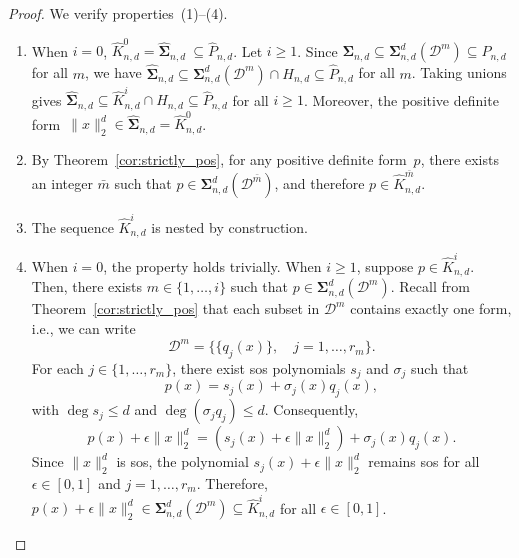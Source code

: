 \documentclass[12pt]{article}
\newcommand{\NN}{P}
\newcommand{\SOS}{\mathbf{\Sigma}}
\newcommand{\HNN}{\widehat{P}}
\newcommand{\HSOS}{\widehat{\mathbf{\Sigma}}}
\newcommand{\DiSOS}{\mathbf{\Sigma}}
\newcommand{\mcD}{\mathcal{D}}
\theoremstyle{remark}
\begin{document}
\begin{proof}
We verify properties~(1)--(4). 
\begin{enumerate}[label=(\arabic*)]
        \item When $i=0$, $\widehat{K}_{n,d}^0=\HSOS_{n,d}\
        \subseteq \HNN_{n,d}$. 
        Let $i\ge 1$.         
        Since $\SOS_{n,d}\subseteq\DiSOS^d_{n,d}(\mcD^m)\subseteq\NN_{n,d}$ for all $m$, we have
        $\HSOS_{n,d}\subseteq\DiSOS^d_{n,d}(\mcD^m)\cap H_{n,d}\subseteq\HNN_{n,d}$ for all $m$. Taking unions gives 
        $\HSOS_{n,d}\subseteq \widehat{K}_{n,d}^i\cap H_{n,d}\subseteq \HNN_{n,d}$ for all $i\ge 1$. Moreover, the positive definite form~$\|x\|_2^d\in\HSOS_{n,d}=\widehat{K}_{n,d}^0$.
        \item By Theorem~\ref{cor:strictly_pos}, for any positive definite form~$p$, there exists an integer $\bar{m}$ such that $p\in \DiSOS^d_{n,d}(\mcD^{\bar{m}})$, and therefore $p\in\widehat{K}_{n,d}^{\bar{m}}$.
        \item The sequence $\widehat{K}_{n,d}^i$ is nested by construction.        
        \item When $i=0$, the property holds trivially. 
        When $i\ge 1$, suppose $p\in\widehat{K}_{n,d}^i$. Then, there exists $m\in\{1,\ldots,i\}$ such that $p\in\SOS_{n,d}^d(\mcD^m)$. 
        Recall from Theorem~\ref{cor:strictly_pos} that each subset in $\mcD^m$ contains exactly one form, i.e., we can write
        \[\mcD^m=\big\{\{q_{j}(x)\},\quad j=1,\ldots,r_m\big\}.\]
 For each $j\in\{1,\ldots,r_m\}$, 
        there exist sos polynomials $s_{j}$ and $\sigma_{j}$ such that
        \[p(x)=s_{j}(x)+\sigma_{j}(x)q_{j}(x),\]
        with $\deg s_{j}\le d$ and $\deg (\sigma_{j}q_{j})\le d$. 
        Consequently, 
        \[p(x) + \epsilon \|x\|_2^d=(s_{j}(x)+\epsilon \|x\|_2^d)+ \sigma_{j}(x)q_{j}(x).\]
        Since $\|x\|_2^d$ is sos, the polynomial $s_{j}(x)+\epsilon \|x\|_2^d$ remains sos for all $\epsilon\in[0,1]$ and $j=1,\ldots,r_m$. Therefore, 
        $p(x) + \epsilon \|x\|_2^d\in \SOS_{n,d}^d(\mcD^m)\subseteq\widehat{K}_{n,d}^i$  for all $\epsilon\in[0,1]$.
    \end{enumerate}
\vspace{-\baselineskip}
\end{proof}
\end{document}
